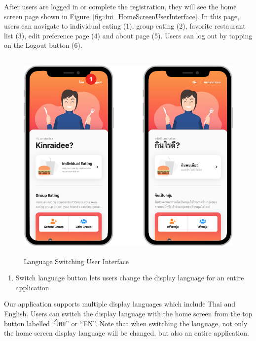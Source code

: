 \documentclass[12pt,oneside,openright,a4paper]{cpe-english-project}
\begin{document}
After users are logged in or complete the registration, they will see the home screen page shown in Figure~\ref{fig:4ui_HomeScreenUserInterface}. In this page, users can navigate to individual eating (1), group eating (2), favorite restaurant list (3), edit preference page (4) and about page (5). Users can log out by tapping on the Logout button (6).
\begin{figure}[H]\centering
\includegraphics[height=300pt]{./images/4ui_LanguageSwitchingUserInterface.png}
\caption{Language Switching User Interface}\label{fig:4ui_LanguageSwitchingUserInterface}
\end{figure}\vspace{-24pt}

\begin{enumerate}
\item Switch language button lets users change the display language for an entire application.
\end{enumerate}

Our application supports multiple display languages which include Thai and English. Users can switch the display language with the home screen from the top button labelled “{\thaifont ไทย}” or “EN”. Note that when switching the language, not only the home screen display language will be changed, but also an entire application.

\newpage
\end{document}
